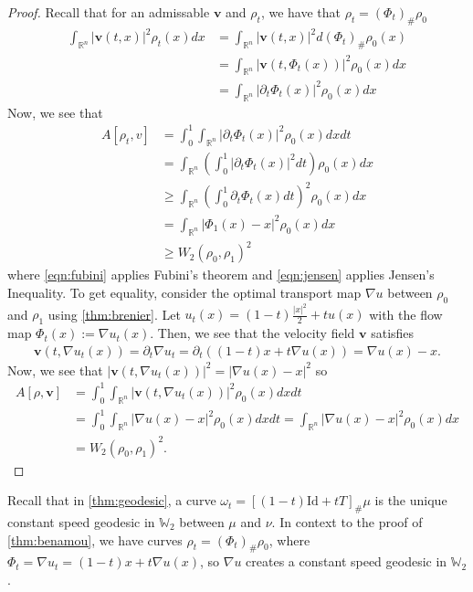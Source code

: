 \documentclass[12pt]{article}
\newcommand{\R}{\mathbb{R}}
\theoremstyle{plain}
\numberwithin{equation}{section}
\begin{document}
\begin{proof}
  Recall that for an admissable $\mathbf{v}$ and $\rho_t$, we have that $\rho_t = (\Phi_t)_\#\rho_0$
  \begin{align*}
		\int_{\mathbb{R}^n}|\mathbf{v}(t,x)|^2\rho_t(x)dx &= \int_{\mathbb{R}^n}|\mathbf{v}(t,x)|^2 d(\Phi_t)_\#\rho_0(x)\\
		&= \int_{\mathbb{R}^n}|\mathbf{v}(t,\Phi_t(x))|^2\rho_0(x)dx\\
    &= \int_{\mathbb{R}^n}|\partial_t\Phi_t(x)|^2\rho_0(x)dx
	\end{align*}
	Now, we see that 
	\begin{align}
		A[\rho_t,v] &= \int_0^1\int_{\mathbb{R}^n}|\partial_t\Phi_t(x)|^2\rho_0(x)dxdt \\
    &= \int_{\mathbb{R}^n}\left(\int_0^1|\partial_t\Phi_t(x)|^2dt\right)\rho_0(x)dx\label{eqn:fubini} \\
		&\ge \int_{\mathbb{R}^n}\left(\int_0^1\partial_t\Phi_t(x)dt\right)^2\rho_0(x)dx\label{eqn:jensen} \\
    &= \int_{\mathbb{R}^n}|\Phi_1(x) - x|^2\rho_0(x)dx\\
		& \ge W_2(\rho_0,\rho_1)^2
	\end{align}
  where \autoref{eqn:fubini} applies Fubini's theorem and \autoref{eqn:jensen} applies Jensen's Inequality.\newline
  To get equality, consider the optimal transport map $\nabla u$ between $\rho_0$ and $\rho_1$ using \autoref{thm:brenier}. Let $u_t(x) = (1-t)\frac{|x|^2}{2}+tu(x)$ with the flow map $\Phi_t(x) := \nabla u_t(x)$. 
  Then, we see that the velocity field $\mathbf{v}$ satisfies 
  \begin{align*}
    \mathbf{v}(t,\nabla u_t(x)) = \partial_t\nabla u_t = \partial_t((1-t)x + t\nabla u(x)) = \nabla u(x) - x.
  \end{align*}
  Now, we see that $|\mathbf{v}(t,\nabla u_t(x))|^2 = |\nabla u(x) - x|^2$ so 
  \begin{align*}
    A[\rho,\mathbf{v}] &= \int_0^1\int_{\R^n} |\mathbf{v}(t,\nabla u_t(x))|^2\rho_0(x)dxdt \\
    &= \int_0^1\int_{\R^n} |\nabla u(x) - x|^2\rho_0(x)dxdt = \int_{\R^n} |\nabla u(x) - x|^2\rho_0(x) dx \\
    &= W_2(\rho_0,\rho_1)^2.
  \end{align*}
\end{proof}
Recall that in \autoref{thm:geodesic}, a curve $\omega_t = \left[(1-t)\text{Id} + tT\right]_\#\mu$ is the unique constant speed geodesic in $\mathbb{W}_2$ between $\mu$ and $\nu$. In context to the proof of \autoref{thm:benamou}, we have curves $\rho_t = (\Phi_t)_\# \rho_0$, where $\Phi_t = \nabla u_t=(1-t)x + t\nabla u(x)$, so $\nabla u$ creates a constant speed geodesic in $\mathbb{W}_2$.
\newpage
\end{document}
